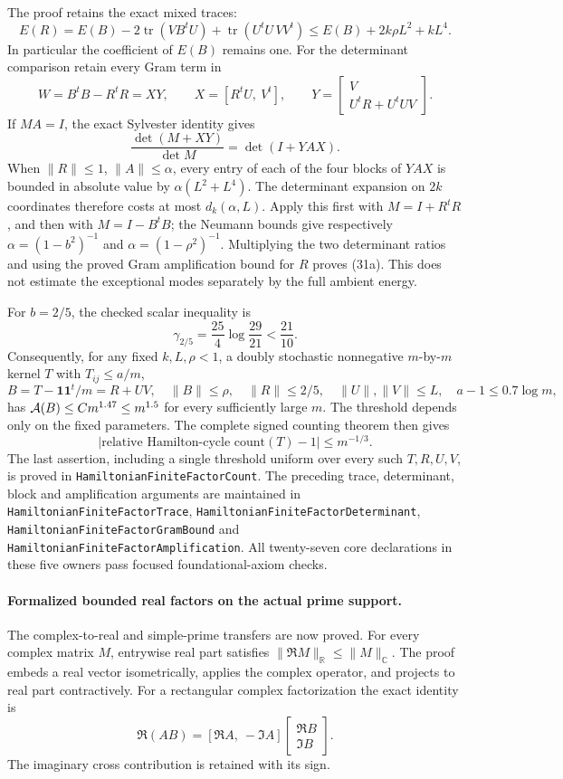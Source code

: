 The proof retains the exact mixed traces:
\[
 E(R)=E(B)-2\operatorname{tr}(VB^tU)
                   +\operatorname{tr}(U^tU\,VV^t)
 \leq E(B)+2k\rho L^2+kL^4.
\]
In particular the coefficient of \(E(B)\) remains one.
For the determinant comparison retain every Gram term in
\[
 W=B^tB-R^tR=XY,\qquad
 X=[R^tU,\ V^t],\qquad
 Y=\begin{bmatrix}V\\ U^tR+U^tUV\end{bmatrix}.
\]
If \(MA=I\), the exact Sylvester identity gives
\[
 \frac{\det(M+XY)}{\det M}=\det(I+YAX).
\]
When \(\|R\|\leq1\), \(\|A\|\leq\alpha\), every entry
of each of the four blocks of \(YAX\) is bounded in
absolute value by \(\alpha(L^2+L^4)\).
The determinant expansion on \(2k\) coordinates therefore
costs at most \(d_k(\alpha,L)\).
Apply this first with \(M=I+R^tR\), and then with
\(M=I-B^tB\); the Neumann bounds give respectively
\(\alpha=(1-b^2)^{-1}\) and
\(\alpha=(1-\rho^2)^{-1}\).
Multiplying the two determinant ratios and using the
proved Gram amplification bound for \(R\) proves (31a).
This does not estimate the exceptional modes separately
by the full ambient energy.

For \(b=2/5\), the checked scalar inequality is
\[
 \gamma_{2/5}=\frac{25}{4}\log\frac{29}{21}
                                      <\frac{21}{10}.
\]
Consequently, for any fixed \(k,L,\rho<1\), a doubly
stochastic nonnegative \(m\)-by-\(m\) kernel \(T\) with
\(T_{ij}\leq a/m\),
\[
 B=T-\mathbf1\mathbf1^t/m=R+UV,\quad
 \|B\|\leq\rho,\quad \|R\|\leq2/5,\quad
 \|U\|,\|V\|\leq L,\quad a-1\leq0.7\log m,
\]
has \({\cal A}(B)\leq C m^{1.47}\leq m^{1.5}\)
for every sufficiently large \(m\).
The threshold depends only on the fixed parameters.
The complete signed counting theorem then gives
\[
 \left|\text{relative Hamilton-cycle count}(T)-1\right|
                                                   \leq m^{-1/3}.
\]
The last assertion, including a single threshold uniform
over every such \(T,R,U,V\), is proved in
\texttt{HamiltonianFiniteFactorCount}.
The preceding trace, determinant, block and amplification
arguments are maintained in
\texttt{HamiltonianFiniteFactorTrace},
\texttt{HamiltonianFiniteFactorDeterminant},
\texttt{HamiltonianFiniteFactorGramBound} and
\texttt{HamiltonianFiniteFactorAmplification}.
All twenty-seven core declarations in these five owners
pass focused foundational-axiom checks.

\paragraph{Formalized bounded real factors on the actual prime support.}
The complex-to-real and simple-prime transfers are now proved.
For every complex matrix \(M\), entrywise real part satisfies
\(\|\Re M\|_{\mathbb R}\leq\|M\|_{\mathbb C}\).
The proof embeds a real vector isometrically, applies the
complex operator, and projects to real part contractively.
For a rectangular complex factorization the exact identity is
\[
 \Re(AB)=[\Re A,\ -\Im A]
                 \begin{bmatrix}\Re B\\ \Im B\end{bmatrix}.
\]
The imaginary cross contribution is retained with its sign.


